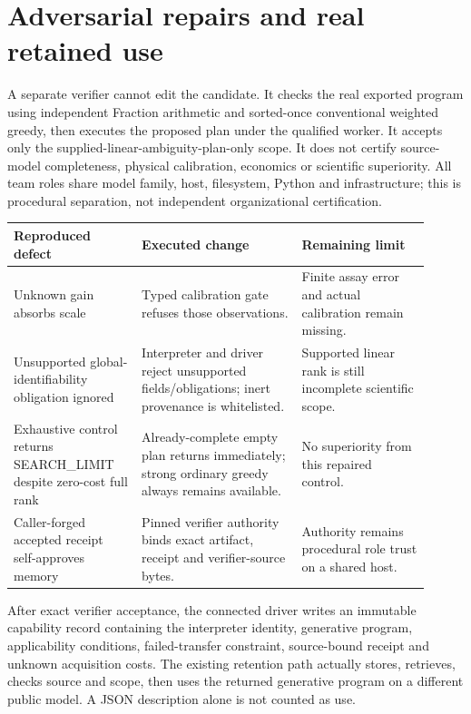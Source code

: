 \documentclass[11pt,letterpaper]{article}
\begin{document}
\section{Adversarial repairs and real retained use}
A separate verifier cannot edit the candidate. It checks the real exported program using independent Fraction arithmetic and sorted-once conventional weighted greedy, then executes the proposed plan under the qualified worker. It accepts only the supplied-linear-ambiguity-plan-only scope. It does not certify source-model completeness, physical calibration, economics or scientific superiority. All team roles share model family, host, filesystem, Python and infrastructure; this is procedural separation, not independent organizational certification.\par
\begingroup\small\begin{longtable}{>{\raggedright\arraybackslash}p{0.28\linewidth}>{\raggedright\arraybackslash}p{0.35\linewidth}>{\raggedright\arraybackslash}p{0.28\linewidth}}\toprule
\textbf{Reproduced defect} & \textbf{Executed change} & \textbf{Remaining limit}\\\midrule\endhead
Unknown gain absorbs scale & Typed calibration gate refuses those observations. & Finite assay error and actual calibration remain missing.\\
Unsupported global-identifiability obligation ignored & Interpreter and driver reject unsupported fields/obligations; inert provenance is whitelisted. & Supported linear rank is still incomplete scientific scope.\\
Exhaustive control returns SEARCH\_LIMIT despite zero-cost full rank & Already-complete empty plan returns immediately; strong ordinary greedy always remains available. & No superiority from this repaired control.\\
Caller-forged accepted receipt self-approves memory & Pinned verifier authority binds exact artifact, receipt and verifier-source bytes. & Authority remains procedural role trust on a shared host.\\
\bottomrule\end{longtable}\endgroup
After exact verifier acceptance, the connected driver writes an immutable capability record containing the interpreter identity, generative program, applicability conditions, failed-transfer constraint, source-bound receipt and unknown acquisition costs. The existing retention path actually stores, retrieves, checks source and scope, then uses the returned generative program on a different public model. A JSON description alone is not counted as use.\par
\end{document}
